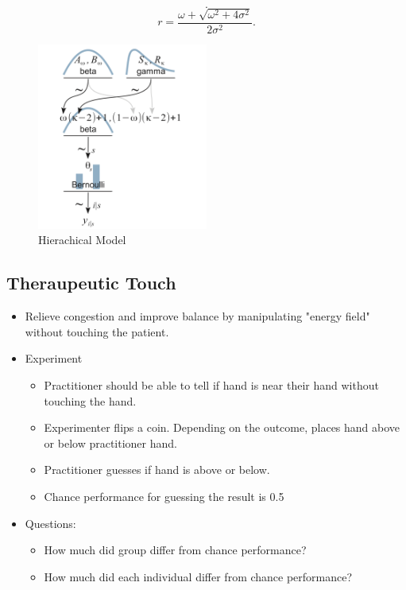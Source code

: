 \documentclass{article}
\begin{document}
\begin{itemize}
\[            .\] 
            \[
                r = \frac{\omega + \sqrt{\omega^2 + 4\sigma^2}}{2\sigma^2} 
            .\] 
        \begin{figure}[H]
            \centering
            \includegraphics[width=0.5\textwidth]{model}
            \caption{Hierachical Model}
            \label{fig:}
        \end{figure} 
    \end{itemize}
    \subsection{Theraupeutic Touch}
    \begin{itemize}
        \item Relieve congestion and improve balance by manipulating "energy field" without touching the patient.
        \item Experiment
            \begin{itemize}
                \item Practitioner should be able to tell if hand is near their hand without touching the hand.
                \item Experimenter flips a coin. Depending on the outcome, places hand above or below practitioner hand.
                \item Practitioner guesses if hand is above or below.
                \item Chance performance for guessing the result is 0.5
            \end{itemize}
        \item Questions:
            \begin{itemize}
                \item How much did group differ from chance performance?
                \item How much did each individual differ from chance performance?
            \end{itemize}
    \end{itemize}
\end{document}
